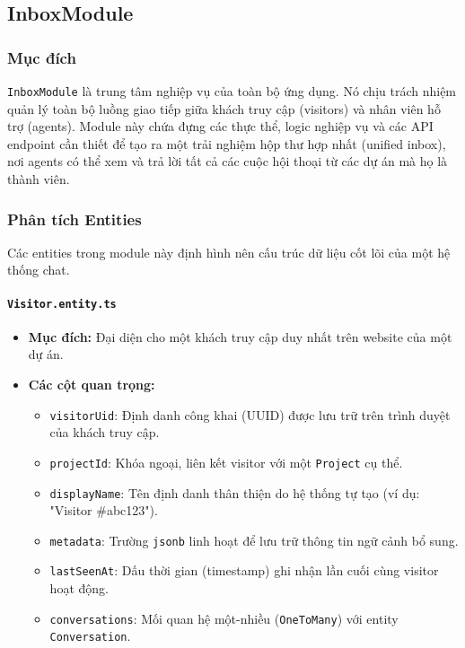 \subsection{InboxModule}
\label{subsec:inbox-module}

\subsubsection{Mục đích}

\texttt{InboxModule} là trung tâm nghiệp vụ của toàn bộ ứng dụng. Nó chịu trách nhiệm quản lý toàn bộ luồng giao tiếp giữa khách truy cập (visitors) và nhân viên hỗ trợ (agents). Module này chứa đựng các thực thể, logic nghiệp vụ và các API endpoint cần thiết để tạo ra một trải nghiệm hộp thư hợp nhất (unified inbox), nơi agents có thể xem và trả lời tất cả các cuộc hội thoại từ các dự án mà họ là thành viên.

\subsubsection{Phân tích Entities}
\label{subsubsec:inbox-entities}

Các entities trong module này định hình nên cấu trúc dữ liệu cốt lõi của một hệ thống chat.

\paragraph{\texttt{Visitor.entity.ts}}
\begin{itemize}
    \item \textbf{Mục đích:} Đại diện cho một khách truy cập duy nhất trên website của một dự án.
    \item \textbf{Các cột quan trọng:}
    \begin{itemize}
        \item \texttt{visitorUid}: Định danh công khai (UUID) được lưu trữ trên trình duyệt của khách truy cập.
        \item \texttt{projectId}: Khóa ngoại, liên kết visitor với một \texttt{Project} cụ thể.
        \item \texttt{displayName}: Tên định danh thân thiện do hệ thống tự tạo (ví dụ: "Visitor \#abc123").
        \item \texttt{metadata}: Trường \texttt{jsonb} linh hoạt để lưu trữ thông tin ngữ cảnh bổ sung.
        \item \texttt{lastSeenAt}: Dấu thời gian (timestamp) ghi nhận lần cuối cùng visitor hoạt động.
        \item \texttt{conversations}: Mối quan hệ một-nhiều (\texttt{OneToMany}) với entity \texttt{Conversation}.
    \end{itemize}
\end{itemize}

